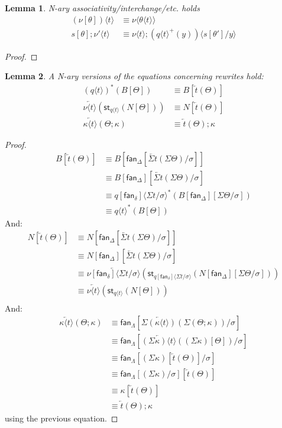 \documentclass[10pt]{article}
\newtheorem{lemma}{Lemma}
\theoremstyle{definition}
\newcommand{\rewrite}[2]{\overleftarrow{#1}(#2)}
\newcommand\St[2]{\ensuremath{{#1}^*(#2)}}
\newcommand\StI[2]{\ensuremath{\mathsf{st}_{#1}(#2)}}
\newcommand\TrPlus[2]{\ensuremath{{#1}^+(#2)}}
\newcommand\fan[1]{\ensuremath{\mathsf{fan}_{#1}}}
\newcommand\ap[2]{\ensuremath{#1 \langle #2 \rangle }}
\begin{document}
\begin{lemma}
N-ary associativity/interchange/etc. holds
\begin{align*}
\ap {(\nu[\theta])} {t} &\equiv \ap \nu {\ap \theta {t}} \\
s[\theta];\ap{\nu'}{t} &\equiv \ap{\nu}{t};\ap{(\TrPlus{\ap{q}{t}}{y})}{s[\theta']/y}
\end{align*}
\end{lemma}
\begin{proof}
\end{proof}

\begin{lemma}
A N-ary versions of the equations concerning rewrites hold:
\begin{align*}
\St{(\ap{q}{t})}{B[\Theta]} &\equiv B[\rewrite{t}{\Theta}] \\
\rewrite{\ap{\nu}{t}}{\StI{\ap{q}{t}}{N[\Theta]}} &\equiv N[\rewrite{t}{\Theta}] \\
\rewrite{\ap{\kappa}{t}}{\Theta;\kappa} &\equiv \rewrite{t}{\Theta};\kappa
\end{align*}
\end{lemma}
\begin{proof}
\begin{align*}
B[\rewrite{t}{\Theta}] 
&\equiv B[\fan{\Delta}[\rewrite{\Sigma t}{\Sigma \Theta}/\sigma]] \\
&\equiv B[\fan{\Delta}][\rewrite{\Sigma t}{\Sigma \Theta}/\sigma] \\
&\equiv \St{\ap{q[\fan{\delta}]}{\Sigma t / \sigma}}{B[\fan{\Delta}][\Sigma \Theta/\sigma]} \\
&\equiv \St{\ap{q}{t}}{B[\Theta]}
\end{align*}
And:
\begin{align*}
N[\rewrite{t}{\Theta}]
&\equiv N[\fan{\Delta}[\rewrite{\Sigma t}{\Sigma \Theta}/\sigma]] \\
&\equiv N[\fan{\Delta}][\rewrite{\Sigma t}{\Sigma \Theta}/\sigma] \\
&\equiv \rewrite{\ap{\nu[\fan{\delta}]}{\Sigma t/\sigma}}{\StI{\ap{q[\fan{\delta}]}{\Sigma t/\sigma}}{N[\fan{\Delta}][\Sigma \Theta/\sigma]}} \\
&\equiv \rewrite{\ap{\nu}{t}}{\StI{\ap{q}{t}}{N[\Theta]}} \\
\end{align*}
And:
\begin{align*}
\rewrite{\ap{\kappa}{t}}{\Theta;\kappa}
&\equiv \fan{\Lambda}[\rewrite{\Sigma(\ap{\kappa}{t})}{\Sigma (\Theta;\kappa)}/\sigma] \\
&\equiv \fan{\Lambda}[\rewrite{\ap{(\Sigma \kappa)}{t}}{(\Sigma \kappa)[\Theta]}/\sigma] \\
&\equiv \fan{\Lambda}[(\Sigma \kappa)[\rewrite{t}{\Theta}]/\sigma] \\
&\equiv \fan{\Lambda}[(\Sigma \kappa)/\sigma][\rewrite{t}{\Theta}] \\
&\equiv \kappa[\rewrite{t}{\Theta}] \\
&\equiv \rewrite{t}{\Theta};\kappa
\end{align*}
using the previous equation.
\end{proof}
\end{document}
